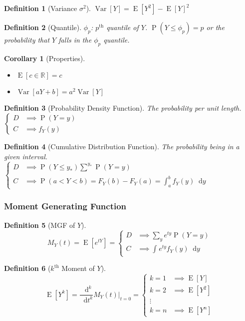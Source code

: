 \documentclass[fontsize=12pt]{article}
\newcommand{\ns}[1]{\mathbb{#1}}
\newcommand{\Reals}[0]{\ns{R}}
\newcommand{\defn}[1]{\textbf{#1}:}
\newcommand{\pr}[1]{\operatorname{P}(#1)}
\newcommand{\expt}[1]{\operatorname{E}[#1]}
\newcommand{\var}[1]{\operatorname{Var}\left[#1\right]}
\newcommand*\diff{\mathop{}\!\mathrm{d}}
\newcommand{\drv}[3]{\frac{\diff#1^{#3}}{\diff#2^{#3}}}
\newcommand{\intv}[4]{\int_{#3}^{#4} #1 \diff #2}
\newtheorem*{definition}{Definition}
\newtheorem*{corollary}{Corollary}
\begin{document}
\begin{definition}[Variance $\sigma^2$]
$\var{Y} = \expt{Y^2} - \expt{Y}^2$
\end{definition}

\begin{definition}[Quantile]
    \defn{$\phi_p$} $p^{\text{th}}$ quantile of $Y$. $\pr{Y \leq \phi_p} = p$ or the probability that $Y$ falls in the $\phi_p$ quantile.
\end{definition}

\begin{corollary}[Properties]\end{corollary}
\begin{itemize}
    \item $\expt{c \in\Reals} = c$
    \item $\var{aY+b} = a^2\var{Y}$
\end{itemize}

\begin{definition}[Probability Density Function]
The probability per unit length.\\
$\begin{cases}
    D &\implies \pr{Y = y}\\
    C & \implies f_Y(y)
\end{cases}$
\end{definition}

\begin{definition}[Cumulative Distribution Function]
The probability being in a given interval.\\
$\begin{cases}
    D &\implies \pr{Y \leq y_\ast}\sum_{}^{y_\ast}\pr{Y = y}\\
    C & \implies \pr{a < Y < b} = F_Y(b) - F_Y(a) = \intv{f_Y(y)}{y}{a}{b}
\end{cases}$
\end{definition}

\subsubsection{Moment Generating Function}
\begin{definition}[MGF of $Y$]
\[
    M_Y(t) = \expt{e^{tY}} = \begin{cases}
        D   &\implies \sum_{y}e^{ty}\pr{Y=y}\\
        C   & \implies \intv{e^{ty}f_Y(y)}{y}{}{}
    \end{cases}
\]
\end{definition}
\begin{definition}[$k^{\text{th}}$ Moment of $Y$]
\[
    \expt{Y^k} = \drv{}{t}{k}M_Y(t)\bigg\rvert_{t=0} = \begin{cases}
        k = 1 & \implies \expt{Y}\\
        k = 2 & \implies  \expt{Y^2}\\
        \vdots\\
        k = n & \implies \expt{Y^n}
    \end{cases}
\]
\end{definition}
\end{document}
